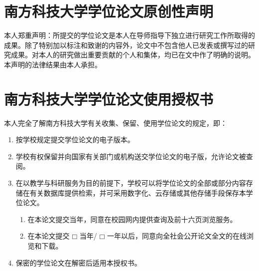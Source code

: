\begin{statementcopyright}
  \section*{南方科技大学学位论文原创性声明}
  \vspace{1em}

  \begin{spacing}{1.25}
    本人郑重声明：所提交的学位论文是本人在导师指导下独立进行研究工作所取得的成果。除了特别加以标注和致谢的内容外，论文中不包含他人已发表或撰写过的研究成果。对本人的研究做出重要贡献的个人和集体，均已在文中作了明确的说明。本声明的法律结果由本人承担。
  \end{spacing}

  \authorsign

  \section*{南方科技大学学位论文使用授权书}
  \vspace{1em}

  \begin{spacing}{1.25}
    本人完全了解南方科技大学有关收集、保留、使用学位论文的规定，即：

    \begin{enumerate}
      \item 按学校规定提交学位论文的电子版本。
      \item 学校有权保留并向国家有关部门或机构送交学位论文的电子版，允许论文被查阅。
      \item 在以教学与科研服务为目的前提下，学校可以将学位论文的全部或部分内容存储在有关数据库提供检索，并可采用数字化、云存储或其他存储手段保存本学位论文。
        \begin{enumerate}[label={(\arabic*)}]
          \item 在本论文提交当年，同意在校园网内提供查询及前十六页浏览服务。
          \item 在本论文提交 $\mdlgwhtsquare$ 当年/ $\mdlgwhtsquare$ 一年以后，同意向全社会公开论文全文的在线浏览和下载。
        \end{enumerate}
      \item 保密的学位论文在解密后适用本授权书。
    \end{enumerate}
  \end{spacing}

  \authorsupervisorsign

\end{statementcopyright}